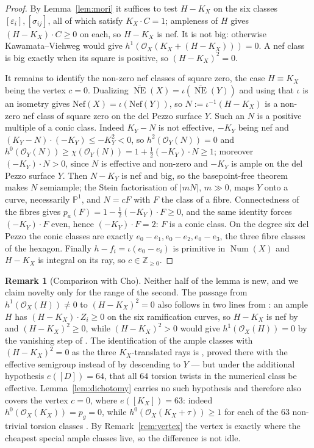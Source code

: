 \documentclass{amsart}
\theoremstyle{definition}
\newtheorem{remark}[theorem]{Remark}
\newcommand{\OO}{\mathcal{O}}
\newcommand{\PP}{\mathbb{P}}
\newcommand{\ZZ}{\mathbb{Z}}
\newcommand{\Num}{\operatorname{Num}}
\newcommand{\NE}{\overline{\operatorname{NE}}}
\begin{document}
\begin{proof}
By Lemma~\ref{lem:mori} it suffices to test $H-K_X$ on the six classes $[\varepsilon_i],[\sigma_{ij}]$, all of which satisfy $K_X\cdot C=1$; ampleness of $H$ gives $(H-K_X)\cdot C\ge0$ on each, so $H-K_X$ is nef. It is not big: otherwise Kawamata--Viehweg would give $h^1(\OO_X(K_X+(H-K_X)))=0$. A nef class is big exactly when its square is positive, so $(H-K_X)^2=0$.

It remains to identify the non-zero nef classes of square zero, the case $H\equiv K_X$ being the vertex $c=0$. Dualizing $\NE(X)=\iota(\NE(Y))$ and using that $\iota$ is an isometry gives $\mathrm{Nef}(X)=\iota(\mathrm{Nef}(Y))$, so $N:=\iota^{-1}(H-K_X)$ is a non-zero nef class of square zero on the del Pezzo surface $Y$. Such an $N$ is a positive multiple of a conic class. Indeed $K_Y-N$ is not effective, $-K_Y$ being nef and $(K_Y-N)\cdot(-K_Y)\le-K_Y^2<0$, so $h^2(\OO_Y(N))=0$ and $h^0(\OO_Y(N))\ge\chi(\OO_Y(N))=1+\tfrac12(-K_Y)\cdot N\ge1$; moreover $(-K_Y)\cdot N>0$, since $N$ is effective and non-zero and $-K_Y$ is ample on the del Pezzo surface $Y$. Then $N-K_Y$ is nef and big, so the basepoint-free theorem makes $N$ semiample; the Stein factorisation of $|mN|$, $m\gg0$, maps $Y$ onto a curve, necessarily $\PP^1$, and $N=cF$ with $F$ the class of a fibre. Connectedness of the fibres gives $p_a(F)=1-\tfrac12(-K_Y)\cdot F\ge0$, and the same identity forces $(-K_Y)\cdot F$ even, hence $(-K_Y)\cdot F=2$: $F$ is a conic class. On the degree six del Pezzo the conic classes are exactly $e_0-e_1,e_0-e_2,e_0-e_3$, the three fibre classes of the hexagon. Finally $h-f_i=\iota(e_0-e_i)$ is primitive in $\Num(X)$ and $H-K_X$ is integral on its ray, so $c\in\ZZ_{\ge0}$.
\end{proof}

\begin{remark}[Comparison with Cho]\label{rem:dichotomy-cho}
Neither half of the lemma is new, and we claim novelty only for the range of the second. The passage from $h^1(\OO_X(H))\neq0$ to $(H-K_X)^2=0$ also follows in two lines from \cite{Cho26}: an ample $H$ has $(H-K_X)\cdot Z_i\ge0$ on the six ramification curves, so $H-K_X$ is nef by \cite[Prop.~4.2]{Cho26} and $(H-K_X)^2\ge0$, while $(H-K_X)^2>0$ would give $h^1(\OO_X(H))=0$ by the vanishing step of \cite[Algorithm~4.18(3.1)]{Cho26}. The identification of the ample classes with $(H-K_X)^2=0$ as the three $K_X$-translated rays is \cite[Prop.~4.10]{Cho26}, proved there with the effective semigroup instead of by descending to $Y$ --- but under the additional hypothesis $e([D])=64$, that all $64$ torsion twists in the numerical class be effective. Lemma~\ref{lem:dichotomy} carries no such hypothesis and therefore also covers the vertex $c=0$, where $e([K_X])=63$: indeed $h^0(\OO_X(K_X))=p_g=0$, while $h^0(\OO_X(K_X+\tau))\ge1$ for each of the $63$ non-trivial torsion classes \cite[\S4.2]{Cho26}. By Remark~\ref{rem:vertex} the vertex is exactly where the cheapest special ample classes live, so the difference is not idle.
\end{remark}
\end{document}

